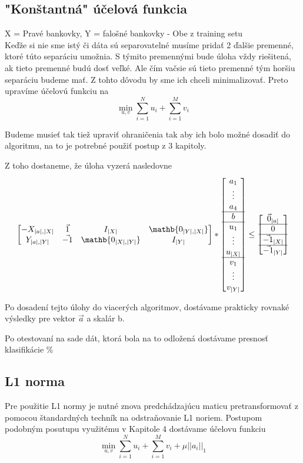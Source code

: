 \documentclass{article}
\begin{document}
\subsection{"Konštantná" účelová funkcia}
X = Pravé bankovky, Y = falošné bankovky - Obe z training setu\\
Keďže si nie sme istý či dáta sú separovatelné musíme pridať 2 ďalšie premenné, ktoré túto separáciu umožnia. S týmito premennými bude úloha vždy riešitená, ak tieto premenné budú dosť veľké. Ale čím vačsie sú tieto premenné tým horšiu separáciu budeme mať. Z tohto dôvodu by sme ich chceli minimalizovať. Preto upravíme účelovú funkciu na
\[\min_{u,v} \sum_{i=1}^{N}{u_i} + \sum_{i=1}^{M}{v_i}\]

Budeme musieť tak tiež upraviť ohraničenia tak aby ich bolo možné dosadiť do algoritmu, na to je potrebné použiť postup z 3 kapitoly.

Z toho dostaneme, že úloha vyzerá nasledovne
\[\begin{bmatrix}
-X_{|a|,|X|} & \Vec{1} & I_{|X|} & \mathb{0_{|Y|,|X|}} \\
Y_{|a|,|Y|} & \Vec{-1} & \mathb{0_{|X|,|Y|}} & I_{|Y|}
\end{bmatrix}
* 
\begin{bmatrix}
a_1 \\ \vdots \\ a_4 \\ \hline
 b \\ \hline
 u_1 \\ \vdots \\ u_{|X|} \\ \hline
 v_1 \\ \vdots \\ v_{|Y|}
\end{bmatrix}
\leq
\begin{bmatrix}
\Vec{0}_{|a|} \\ \hline 0 \\ \hline \Vec{-1}_{|X|} \\ \hline \Vec{-1}_{|Y|}
\end{bmatrix}\]

Po dosadení tejto úlohy do viacerých algoritmov, dostávame prakticky rovnaké výsledky pre vektor $\Vec{a}$ a skalár b.

Po otestovaní na sade dát, ktorá bola na to odložená dostávame presnosť klasifikácie \%
\subsection{L1 norma}
Pre použitie L1 normy je nutné znova predchádzajúcu maticu pretransformovať z pomocou štandardných techník na odstraňovanie L1 noriem. Postupom podobným posutupu využitému v Kapitole 4
dostávame účelovu funkciu \[\min_{u,v} \sum_{i=1}^{N}{u_i} + \sum_{i=1}^{M}{v_i} + \mu||a_i||_1\]
\end{document}
